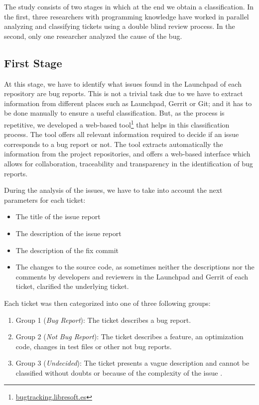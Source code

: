 \documentclass[ifip]{svmult}
\begin{document}
The study consists of two stages in which at the end we obtain a classification. In the first, three researchers with programming knowledge have worked in parallel analyzing and classifying tickets using a double blind review process. In the second, only one researcher analyzed the cause of the bug.

\subsection{First Stage}
\label{subsec:first}

At this stage, we have to identify what issues found in the Launchpad of each repository are bug reports. This is not a trivial task due to we have to extract information from different places such as Launchpad, Gerrit or Git; and it has to be done manually to ensure a useful classification. But, as the process is repetitive, we developed a web-based tool\footnote{\url{bugtracking.libresoft.es}} that helps in this classification process. The tool offers all relevant information required to decide if an issue corresponds to a bug report or not. The tool extracts automatically the information from the project repositories, and offers a web-based interface which allows for collaboration, traceability and transparency in the identification of bug reports.

During the analysis of the issues, we have to take into account the next parameters for each ticket:

\begin{itemize}
  \item The title of the issue report
  \item The description of the issue report
  \item The description of the fix commit
  \item The changes to the source code, as sometimes neither the descriptions nor the comments by developers and reviewers in the Launchpad and Gerrit of each ticket, clarified the underlying ticket.
\end{itemize}

Each ticket was then categorized into one of three following groups:

\begin{enumerate}
  \item Group 1 (\textit{Bug Report}): The ticket describes a bug report.
  \item Group 2 (\textit{Not Bug Report}): The ticket describes a feature, an optimization code, changes in test files or other not bug reports.
  \item Group 3 (\textit{Undecided}): The ticket presents a vague description and cannot be classified without doubts or because of the complexity of the issue .
\end{enumerate}
\end{document}
